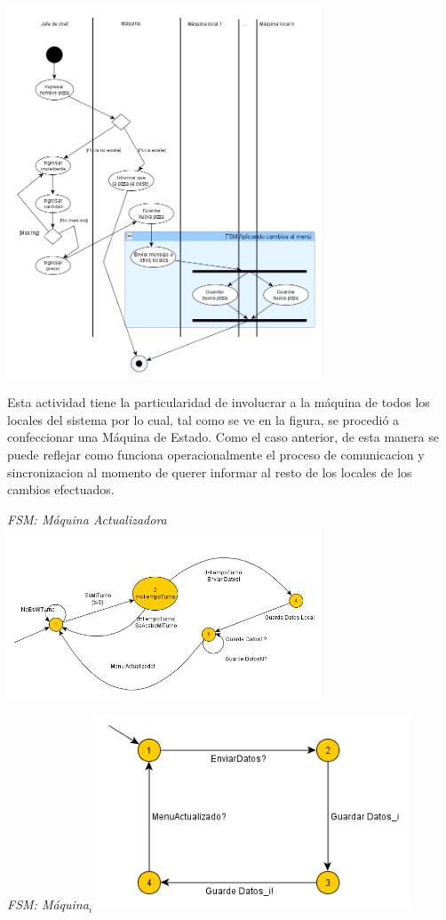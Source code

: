 \documentclass[a4paper,11pt] {article}
\begin{document}
\begin{center}
 \includegraphics[width=0.7\textwidth]{Diagramas/DiagramaActividadNuevaPizza.png}
\end{center}

Esta actividad tiene la particularidad de involucrar a la m\'aquina de todos los locales del sistema por lo cual, tal como se ve en la figura, se procedi\'o a confeccionar una M\'aquina de Estado. Como el caso anterior, de esta manera se puede reflejar como funciona operacionalmente el proceso de comunicacion y sincronizacion al momento de querer informar al resto de los locales de los cambios efectuados.

\begin{center}
 \textit{FSM: M\'aquina Actualizadora}
 \includegraphics[width=0.7\textwidth]{Diagramas/FSMActualizacionActualizadora.png}
\end{center}
\begin{center}
 \textit{FSM: M\'aquina$_{i}$}
 \includegraphics[width=0.7\textwidth]{Diagramas/FSMActualizacionMaquinai.png}
\end{center}
\end{document}
